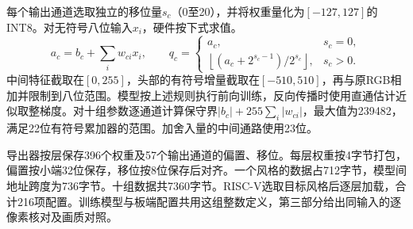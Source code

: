 每个输出通道选取独立的移位量$s_c$（0至20），并将权重量化为$[-127,127]$的INT8。对无符号八位输入$x_i$，硬件按下式求值。
\[
a_c=b_c+\sum_i w_{ci}x_i,\qquad
q_c=\begin{cases}
 a_c,&s_c=0,\\
 \left\lfloor(a_c+2^{s_c-1})/2^{s_c}\right\rfloor,&s_c>0 .
\end{cases}
\]
中间特征截取在$[0,255]$，头部的有符号增量截取在$[-510,510]$，再与原RGB相加并限制到八位范围。模型按上述规则执行前向训练，反向传播时使用直通估计近似取整梯度\cite{qat}。对十组参数逐通道计算保守界$|b_c|+255\sum_i |w_{ci}|$，最大值为239482，满足22位有符号累加器的范围。加舍入量的中间通路使用23位。

导出器按层保存396个权重及57个输出通道的偏置、移位。每层权重按4字节打包，偏置按小端32位保存，移位按8位保存后对齐。一个风格的数据占712字节，模型间地址跨度为736字节。十组数据共7360字节。RISC-V选取目标风格后逐层加载，合计216项配置。训练模型与板端配置共用这组整数定义，第三部分给出同输入的逐像素核对及画质对照。
